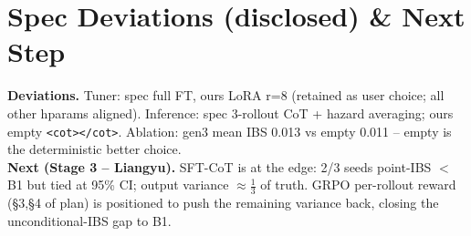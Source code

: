 \documentclass[10pt]{article}
\begin{document}
\section*{Spec Deviations (disclosed) \& Next Step}
\textbf{Deviations.} Tuner: spec full FT, ours LoRA r=8 (retained as user choice; all other hparams aligned).
Inference: spec 3-rollout CoT + hazard averaging; ours empty \texttt{<cot></cot>}. Ablation: gen3 mean IBS 0.013 vs empty 0.011 -- empty is the deterministic better choice.\\
\textbf{Next (Stage 3 -- Liangyu).} SFT-CoT is at the edge: 2/3 seeds point-IBS $<$ B1 but tied at 95\% CI; output variance $\approx\tfrac{1}{3}$ of truth.
GRPO per-rollout reward (\S3,\S4 of plan) is positioned to push the remaining variance back, closing the unconditional-IBS gap to B1.
\end{document}
